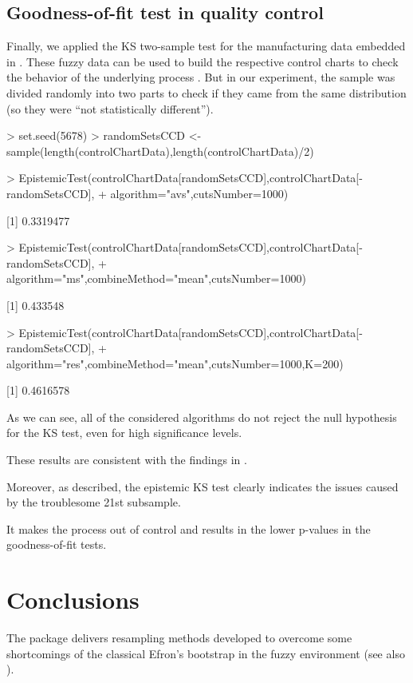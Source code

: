 

\subsection{Goodness-of-fit test in quality control}


Finally, we applied the KS two-sample test for the manufacturing data embedded in .
These fuzzy data can be used to build the respective control charts to check the behavior of the underlying process \citep{FARAZ20102684}.
But in our experiment, the sample was divided randomly into two parts to check if they came from the same distribution (so they were ``not statistically different'').

\begin{example}
> set.seed(5678)
> randomSetsCCD <- sample(length(controlChartData),length(controlChartData)/2)

> EpistemicTest(controlChartData[randomSetsCCD],controlChartData[-randomSetsCCD],
+  algorithm="avs",cutsNumber=1000)

[1] 0.3319477

> EpistemicTest(controlChartData[randomSetsCCD],controlChartData[-randomSetsCCD],
+  algorithm="ms",combineMethod="mean",cutsNumber=1000)

[1] 0.433548

> EpistemicTest(controlChartData[randomSetsCCD],controlChartData[-randomSetsCCD],
+  algorithm="res",combineMethod="mean",cutsNumber=1000,K=200)

[1] 0.4616578
\end{example}

As we can see, all of the considered algorithms do not reject the null hypothesis for the KS test, even for high significance levels.

These results are consistent with the findings in \cite{FARAZ20102684}.

Moreover, as \cite{PGMR2024AMS} described, the epistemic KS test clearly indicates the issues caused by the troublesome 21st subsample.

It makes the process out of control and results in the lower p-values in the goodness-of-fit tests.


\section{Conclusions}

The  package delivers resampling methods developed to overcome some shortcomings of the classical Efron's bootstrap in the fuzzy environment (see also \cite{fuzzyResamplingArt}).

